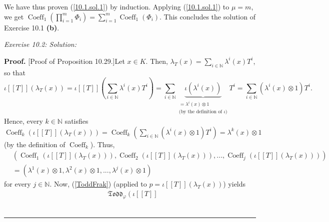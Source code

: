 \documentclass[numbers=enddot,12pt,final,onecolumn,notitlepage]{scrartcl}%
\newenvironment{proof}[1][Proof]{\noindent\textbf{#1.} }{\ \rule{0.5em}{0.5em}}
\begin{document}
We have thus proven (\ref{10.1.sol.1}) by induction. Applying
(\ref{10.1.sol.1}) to $\mu=m$, we get $\operatorname*{Coeff}\nolimits_{1}%
\left(  \prod\limits_{i=1}^{m}\Phi_{i}\right)  =\sum\limits_{i=1}%
^{m}\operatorname*{Coeff}\nolimits_{1}\left(  \Phi_{i}\right)  $. This
concludes the solution of Exercise 10.1 \textbf{(b)}.

\textit{Exercise 10.2: Solution:}

\begin{proof}
[Proof of Proposition 10.29.]Let $x\in K$. Then, $\lambda_{T}\left(  x\right)
=\sum\limits_{i\in\mathbb{N}}\lambda^{i}\left(  x\right)  T^{i}$, so that%
\[
\iota\left[  \left[  T\right]  \right]  \left(  \lambda_{T}\left(  x\right)
\right)  =\iota\left[  \left[  T\right]  \right]  \left(  \sum\limits_{i\in
\mathbb{N}}\lambda^{i}\left(  x\right)  T^{i}\right)  =\sum\limits_{i\in
\mathbb{N}}\underbrace{\iota\left(  \lambda^{i}\left(  x\right)  \right)
}_{\substack{=\lambda^{i}\left(  x\right)  \otimes1\\\text{(by the definition
of }\iota\text{)}}}T^{i}=\sum\limits_{i\in\mathbb{N}}\left(  \lambda
^{i}\left(  x\right)  \otimes1\right)  T^{i}.
\]
Hence, every $k\in\mathbb{N}$ satisfies $\operatorname*{Coeff}\nolimits_{k}%
\left(  \iota\left[  \left[  T\right]  \right]  \left(  \lambda_{T}\left(
x\right)  \right)  \right)  =\operatorname*{Coeff}\nolimits_{k}\left(
\sum\limits_{i\in\mathbb{N}}\left(  \lambda^{i}\left(  x\right)
\otimes1\right)  T^{i}\right)  =\lambda^{k}\left(  x\right)  \otimes1$ (by the
definition of $\operatorname*{Coeff}\nolimits_{k}$). Thus,
\begin{align}
&  \left(  \operatorname*{Coeff}\nolimits_{1}\left(  \iota\left[  \left[
T\right]  \right]  \left(  \lambda_{T}\left(  x\right)  \right)  \right)
,\operatorname*{Coeff}\nolimits_{2}\left(  \iota\left[  \left[  T\right]
\right]  \left(  \lambda_{T}\left(  x\right)  \right)  \right)
,...,\operatorname*{Coeff}\nolimits_{j}\left(  \iota\left[  \left[  T\right]
\right]  \left(  \lambda_{T}\left(  x\right)  \right)  \right)  \right)
\nonumber\\
&  =\left(  \lambda^{1}\left(  x\right)  \otimes1,\lambda^{2}\left(  x\right)
\otimes1,...,\lambda^{j}\left(  x\right)  \otimes1\right)  \label{10.29.pf.1}%
\end{align}
for every $j\in\mathbb{N}$. Now, (\ref{ToddFrak}) (applied to $p=\iota\left[
\left[  T\right]  \right]  \left(  \lambda_{T}\left(  x\right)  \right)  $)
yields%
\begin{align*}
&  \mathfrak{Todd}_{\varphi}\left(  \iota\left[  \left[  T\right]  \right]

\end{align*}
\end{proof}
\end{document}
